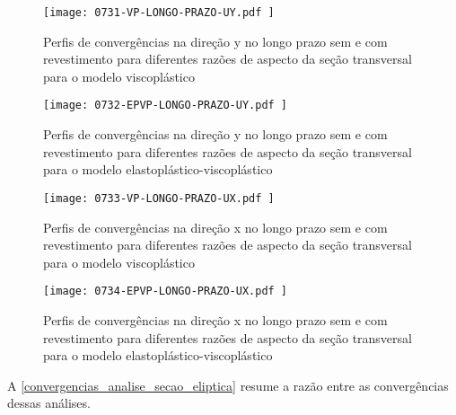 \begin{figure}[H]
	\begin{center}
		\texttt{[image: 0731-VP-LONGO-PRAZO-UY.pdf
		]}
	\end{center}
	\caption{\label{VP-LONGO-PRAZO-UY}Perfis de convergências na direção y no longo prazo sem e com revestimento para diferentes razões de aspecto da seção transversal para o modelo viscoplástico}
\end{figure}

\begin{figure}[H]
	\begin{center}
		\texttt{[image: 0732-EPVP-LONGO-PRAZO-UY.pdf
		]}
	\end{center}
	\caption{\label{EPVP-LONGO-PRAZO-UY}Perfis de convergências na direção y no longo prazo sem e com revestimento para diferentes razões de aspecto da seção transversal para o modelo elastoplástico-viscoplástico}
\end{figure}

\begin{figure}[H]
	\begin{center}
		\texttt{[image: 0733-VP-LONGO-PRAZO-UX.pdf
		]}
	\end{center}
	\caption{\label{VP-LONGO-PRAZO-UX}Perfis de convergências na direção x no longo prazo sem e com revestimento para diferentes razões de aspecto da seção transversal para o modelo viscoplástico}
\end{figure}

\begin{figure}[H]
	\begin{center}
		\texttt{[image: 0734-EPVP-LONGO-PRAZO-UX.pdf
		]}
	\end{center}
	\caption{\label{EPVP-LONGO-PRAZO-UX}Perfis de convergências na direção x no longo prazo sem e com revestimento para diferentes razões de aspecto da seção transversal para o modelo elastoplástico-viscoplástico}
\end{figure}

A \autoref{convergencias_analise_secao_eliptica} resume a razão entre as convergências dessas análises.

